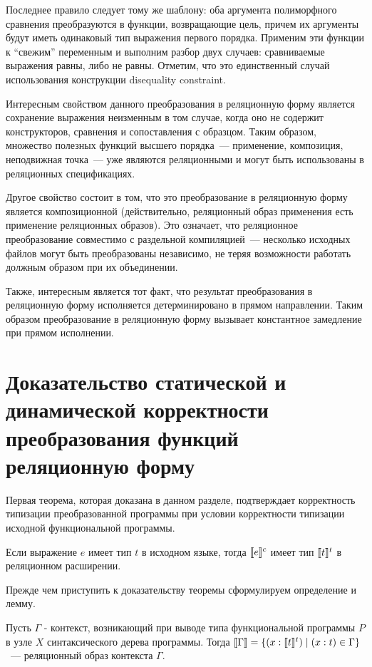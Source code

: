 Последнее правило следует тому же шаблону: оба аргумента полиморфного сравнения преобразуются в функции, возвращающие цель, причем их аргументы будут иметь одинаковый тип выражения первого порядка. Применим эти функции к ``свежим'' переменным и выполним разбор двух случаев: сравниваемые выражения равны, либо не равны. Отметим, что это единственный случай использования конструкции disequality constraint.

Интересным свойством данного преобразования в реляционную форму является сохранение выражения неизменным в том случае, когда оно не содержит конструкторов, сравнения и сопоставления с образцом. Таким образом, множество полезных функций высшего порядка~--- применение, композиция, неподвижная точка~--- уже являются реляционными и могут быть использованы в реляционных спецификациях.

Другое свойство состоит в том, что это преобразование в реляционную форму является композиционной (действительно, реляционный образ применения есть применение реляционных образов). Это означает, что реляционное преобразование совместимо с раздельной компиляцией~--- несколько исходных файлов могут быть преобразованы независимо, не теряя возможности работать должным образом при их объединении.

Также, интересным является тот факт, что результат преобразования в реляционную форму исполняется детерминировано в прямом направлении. Таким образом преобразование в реляционную форму вызывает константное замедление при прямом исполнении.

\section{Доказательство статической и динамической корректности преобразования функций реляционную форму}

Первая теорема, которая доказана в данном разделе, подтверждает корректность типизации преобразованной программы при условии корректности типизации исходной функциональной программы.

\begin{theorem} 
Если выражение $e$ имеет тип $t$ в исходном языке, тогда $\llbracket{e}\rrbracket^c$ имеет тип $\llbracket{t}\rrbracket^t$ в реляционном расширении.
\end{theorem}

Прежде чем приступить к доказательству теоремы сформулируем определение и лемму.

\begin{definition}
\normalfont Пусть $\Gamma$ - контекст, возникающий при выводе типа функциональной программы $P$ в узле $X$ синтаксического дерева программы. Тогда $\llbracket{\Gamma}\rrbracket = \{(x : \llbracket{t}\rrbracket^t) \mid (x:t)\in \Gamma\}$~--- реляционный образ контекста $\Gamma$.
\end{definition}


